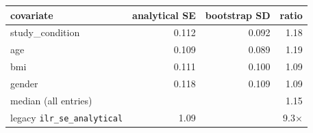 \begin{tabular}{lrrr}
\toprule
covariate & analytical SE & bootstrap SD & ratio \\
\midrule
study_condition & 0.112 & 0.092 & 1.18 \\
age & 0.109 & 0.089 & 1.19 \\
bmi & 0.111 & 0.100 & 1.09 \\
gender & 0.118 & 0.109 & 1.09 \\
\midrule
median (all entries) & & & 1.15 \\
legacy \texttt{ilr\_se\_analytical} & 1.09 & & 9.3$\times$ \\
\bottomrule
\end{tabular}

